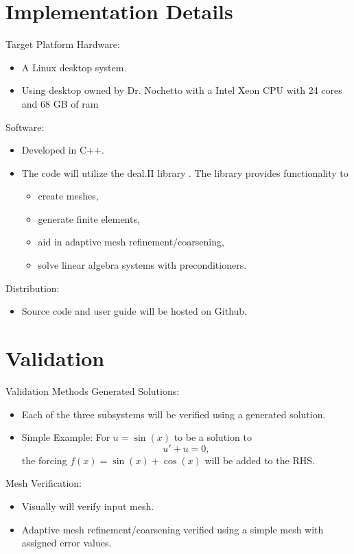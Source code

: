 \documentclass[9pt]{beamer}
\begin{document}
\section{Implementation Details}
\begin{frame}{Target Platform}
	Hardware:
	\begin{itemize}
		\item A Linux desktop system.
	
		
		\item Using desktop owned by Dr. Nochetto with a Intel Xeon CPU with 24 cores and 68 GB of ram
	\end{itemize}

	Software:
	\begin{itemize}
		\item Developed in C++.
		
		\item The code will utilize the deal.II library \cite{AdaptiveMesh:1,DealII}. The library provides functionality to
		\begin{itemize}
			\item create meshes,
			\item generate finite elements,
			\item aid in adaptive mesh refinement/coarsening,
			\item solve linear algebra systems with preconditioners.
		\end{itemize}
	\end{itemize}

	Distribution:
	\begin{itemize}
		\item Source code and user guide will be hosted on Github.
	\end{itemize}
\end{frame}

\section{Validation}
\begin{frame}{Validation Methods}
	Generated Solutions:
	\begin{itemize}
		\item Each of the three subsystems will be verified using a generated solution.
		\item Simple Example: For $u=\sin(x)$ to be a solution to 
		$$
			u' + u = 0,
		$$
		the forcing $f(x) = \sin(x) + \cos(x)$ will be added to the RHS.
	\end{itemize}
	
	Mesh Verification:
	\begin{itemize}
		\item Visually will verify input mesh.
		
		\item Adaptive mesh refinement/coarsening verified using a simple mesh with assigned error values.
	\end{itemize}
\end{frame}
\end{document}
